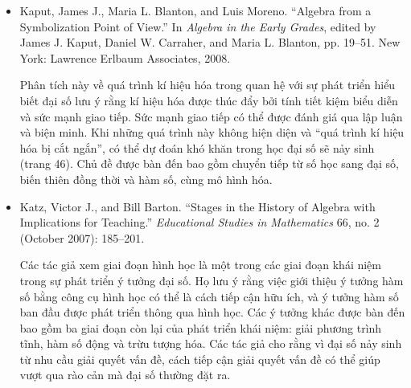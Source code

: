 {{\begin{itemize}
          \par\noindent\hspace*{1em} Saul xác định ba cấp độ trong việc học đại số: khái quát hóa số học, chú ý đến phép toán hai ngôi, và nhận diện dạng đại số, trong đó học sinh có thể quan niệm biến là đại diện cho các biểu thức đại số phức tạp. Học sinh có sự hiểu chưa đầy đủ sẽ bám vào quy tắc ghi nhớ. Việc loại bỏ khả năng thử và sai có thể buộc học sinh tập trung vào các phép toán liên quan trong bài toán đại số và đưa các em từ cấp độ thứ nhất của sự hiểu sang cấp độ thứ hai.\vspace{1.35\baselineskip}

        \item Kaput, James J., Maria L. Blanton, and Luis Moreno. ``Algebra from a Symbolization Point of View.'' In \emph{Algebra in the Early Grades}, edited by James J. Kaput, Daniel W. Carraher, and Maria L. Blanton, pp. 19--51. New York: Lawrence Erlbaum Associates, 2008.\vspace{.25\baselineskip}

          \par\noindent\hspace*{1em} Phân tích này về quá trình kí hiệu hóa trong quan hệ với sự phát triển hiểu biết đại số lưu ý rằng kí hiệu hóa được thúc đẩy bởi tính tiết kiệm biểu diễn và sức mạnh giao tiếp. Sức mạnh giao tiếp có thể được đánh giá qua lập luận và biện minh. Khi những quá trình này không hiện diện và ``quá trình kí hiệu hóa bị cắt ngắn'', có thể dự đoán khó khăn trong học đại số sẽ nảy sinh (trang 46). Chủ đề được bàn đến bao gồm chuyển tiếp từ số học sang đại số, biến thiên đồng thời và hàm số, cùng mô hình hóa.\vspace{1.35\baselineskip}

        \item Katz, Victor J., and Bill Barton. ``Stages in the History of Algebra with Implications for Teaching.'' \emph{Educational Studies in Mathematics} 66, no. 2 (October 2007): 185--201.\vspace{.25\baselineskip}

          \par\noindent\hspace*{1em} Các tác giả xem giai đoạn hình học là một trong các giai đoạn khái niệm trong sự phát triển ý tưởng đại số. Họ lưu ý rằng việc giới thiệu ý tưởng hàm số bằng công cụ hình học có thể là cách tiếp cận hữu ích, và ý tưởng hàm số ban đầu được phát triển thông qua hình học. Các ý tưởng khác được bàn đến bao gồm ba giai đoạn còn lại của phát triển khái niệm: giải phương trình tĩnh, hàm số động và trừu tượng hóa. Các tác giả cho rằng vì đại số nảy sinh từ nhu cầu giải quyết vấn đề, cách tiếp cận giải quyết vấn đề có thể giúp vượt qua rào cản mà đại số thường đặt ra.
      \end{itemize}}
  }{\NOTE{}}

